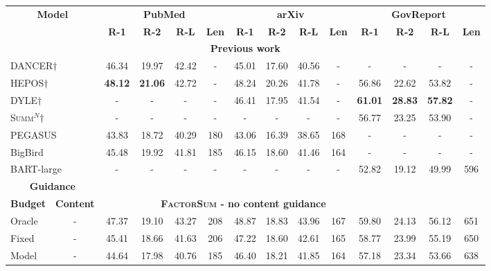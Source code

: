 \documentclass[11pt,table]{article}
\newcommand{\modelname}{FactorSum}
\begin{document}
\begin{table*}[h]
  \centering
  \setlength\tabcolsep{3.5pt}
  \begin{tabular}{lc|cccc|cccc|cccc}
    \toprule
    \multicolumn{2}{c|}{\multirow{2}{2.2cm}{\centering \textbf{Model}}} & \multicolumn{4}{c|}{\textbf{PubMed}} & \multicolumn{4}{c|}{\textbf{arXiv}} & \multicolumn{4}{c}{\textbf{GovReport}} \\
    \cmidrule(r){3-6} \cmidrule(r){7-10} \cmidrule(r){11-14} 
    &  & \textbf{R-1} & \textbf{R-2} & \textbf{R-L} & \textbf{Len} & \textbf{R-1} & \textbf{R-2} & \textbf{R-L} & \textbf{Len} & \textbf{R-1} & \textbf{R-2} & \textbf{R-L} & \textbf{Len} \\
    \toprule
    \multicolumn{14}{c}{\textbf{Previous work}} \\
    \midrule
    \multicolumn{2}{l|}{DANCER$\dagger$} & 46.34 & 19.97 & 42.42 & - & 45.01 & 17.60 & 40.56 & - & - & - & - & - \\
    \multicolumn{2}{l|}{HEPOS$\dagger$} & \textbf{48.12} & \textbf{21.06} & 42.72 & - & 48.24 & 20.26 & 41.78 & - & 56.86 & 22.62 & 53.82 & - \\
    \multicolumn{2}{l|}{DYLE$\dagger$} & - & - & - & - & 46.41 & 17.95 & 41.54 & - & \textbf{61.01} & \textbf{28.83} & \textbf{57.82} & - \\
    \multicolumn{2}{l|}{\textsc{Summ$^N$}$\dagger$} & - & - & - & - & - & - & - & - & 56.77 & 23.25 & 53.90 & - \\
    \multicolumn{2}{l|}{PEGASUS} & 43.83 & 18.72 & 40.29 & 180 & 43.06 & 16.39 & 38.65 & 168 & - & - & - & - \\
    \multicolumn{2}{l|}{BigBird} & 45.48 & 19.92 & 41.81 & 185 & 46.15 & 18.60 & 41.46 & 164 & - & - & - & - \\
    \multicolumn{2}{l|}{BART-large} & - & - & - & - & - & - & - & - & 52.82 & 19.12 & 49.99 & 596 \\
    \midrule
    \multicolumn{2}{c|}{\textbf{Guidance}} & \multicolumn{12}{c}{} \\
    \cmidrule(r){1-2}
    \textbf{Budget} & \textbf{Content} & \multicolumn{9}{c}{\textbf{\textsc{\modelname} - no content guidance}} \\
    \midrule
    Oracle & - & 47.37 & 19.10 & 43.27 & 208 & 48.87 & 18.83 & 43.96 & 167 & 59.80 & 24.13 & 56.12 & 651 \\
    Fixed & - & 45.41 & 18.66 & 41.63 & 206 & 47.22 & 18.60 & 42.61 & 165 & 58.77 & 23.99 & 55.19 & 650 \\
    Model & - & 44.64 & 17.98 & 40.76 & 185 & 46.40 & 18.21 & 41.85 & 164 & 57.18 & 23.34 & 53.66 & 638 \\

\end{tabular}
\end{table*}
\end{document}
